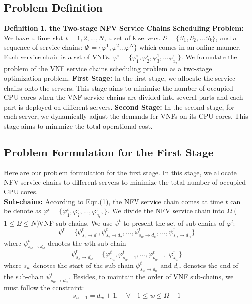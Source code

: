 \documentclass{acmtog}
\begin{document}
\subsection{Problem Definition}
\noindent\textbf{Definition 1. the Two-stage NFV Service Chains Scheduling Problem: } We have a time slot $t={1,2,...,N}$, a set of k servers: $S = \{S_1,S_2,...S_k\}$, and a sequence of service chains: $\Phi = \{\varphi ^1,\varphi ^2...\varphi ^N\}$ which comes in an online manner. Each service chain is a set of VNFs: $\varphi ^i = \{\varphi ^i_1,\varphi ^i_2,\varphi ^1_3,...\varphi ^i_{n_i}\}$. We formulate the problem of the VNF service chains scheduling problem as a two-stage optimization problem. \textbf{First Stage: } In the first stage, we allocate the service chains onto the servers. This stage aims to minimize the number of occupied CPU cores when the VNF service chains are divided into several parts and each part is deployed on different servers. \textbf{Second Stage: } In the second stage, for each server, we dynamically adjust the demands for VNFs on its CPU cores. This stage aims to minimize the total operational cost.








\subsection{Problem Formulation for the First Stage}
\indent Here are our problem formulation for the first stage. In this stage, we allocate NFV service chains to different servers to minimize the total number of occupied CPU cores.
\\\textbf{Sub-chains:} According to Eqn.(1), the NFV service chain comes at time $t$ can be denote as $\varphi^t=\{\varphi^t_1,\varphi^t_2,...,\varphi^t_{n_t},\}$. We divide the NFV service chain into $\Omega$ ($1\leq \Omega \leq N$)VNF sub-chains. We use $\psi^t$ to present the set of sub-chains of $\varphi^t$:
$$\psi^t=\{\psi^t_{s_1\to d_1},\psi^t_{s_2\to d_2},...,\psi^t_{s_w\to d_w},...,\psi^t_{s_{\Omega}\to d_{\Omega}}\}$$
where $\psi^t_{s_{\omega}\to d_{\omega}}$ denotes the $w$th sub-chain
$$\psi^t_{s_{\omega}\to d_{\omega}}=\{\varphi^t_{s_w},\varphi^t_{s_w+1},...,\varphi^t_{d_w-1,}\varphi^t_{d_w}\}$$
where $s_w$ denotes the start of the sub-chain $\psi^t_{s_w\to d_w}$ and $d_w$ denotes the end of the sub-chain $\psi^t_{s_w\to d_w}$. Besides, to maintain the  order of VNF sub-chains, we must follow the constraint:
$$s_{w+1}=d_w+1, \quad \forall\quad 1\leq w\leq \Omega-1$$
\end{document}
